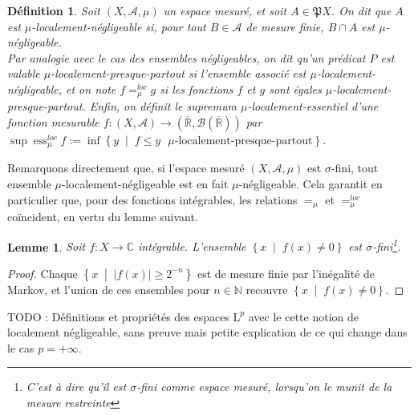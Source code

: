\documentclass[a4paper,12pt]{article}
\newtheorem{definition}[theorem]{Définition}
\newtheorem{lemma}[theorem]{Lemme}
\newcommand{\R}{\mathbb{R}}
\newcommand{\N}{\mathbb{N}}
\newcommand{\C}{\mathbb{C}}
\newcommand{\Bor}{\mathcal{B}}
\newcommand{\abs}[1]{\left\vert#1\right\vert}
\newcommand{\set}[1]{\left\{ #1 \right\}}
\newcommand{\tq}{\;\middle|\;}
\newcommand{\parts}{\mathfrak{P}}
\newcommand{\TODO}[1]{{\color{red}TODO :} #1}
\DeclareMathOperator{\ess}{ess}
\begin{document}
\begin{definition}\label{loc_negligible}
    Soit $(X, \mathcal{A}, \mu)$ un espace mesuré, et soit $A\in\parts{X}$. On dit que $A$ est \emph{$\mu$-localement-négligeable} 
    si, pour tout $B\in\mathcal{A}$ \emph{de mesure finie}, $B\cap A$ est $\mu$-négligeable. \\
    Par analogie avec le cas des ensembles négligeables, on dit qu'un prédicat $P$ est valable 
    \emph{$\mu$-localement-presque-partout} si l'ensemble associé est $\mu$-localement-négligeable,
    et on note $f =_\mu^{loc} g$ si les fonctions $f$ et $g$ sont égales $\mu$-localement-presque-partout.
    Enfin, on définit le \emph{supremum $\mu$-localement-essentiel} d'une fonction mesurable $f:(X, \mathcal{A})\to(\overline{\R},\Bor(\overline{\R}))$ par 
    $\sup\ess_\mu^{loc} f := \inf\set{y\tq f\le y\text{ $\mu$-localement-presque-partout}}$.
\end{definition}

Remarquons directement que, si l'espace mesuré $(X, \mathcal{A}, \mu)$ est $\sigma$-fini, 
tout ensemble $\mu$-localement-négligeable est en fait $\mu$-négligeable. Cela garantit en particulier que, 
pour des fonctions intégrables, les relations $=_\mu$ et $=_\mu^{loc}$ coïncident, en vertu du lemme suivant.

\begin{lemma}\label{presupp_sigma_finite}
    Soit $f:X\to\C$ intégrable. L'ensemble $\set{x\tq f(x)\ne 0}$ est $\sigma$-fini\footnote{C'est à dire qu'il est $\sigma$-fini comme espace mesuré, 
    lorsqu'on le munit de la mesure restreinte}. 
\end{lemma}

\begin{proof}
    Chaque $\set{x\tq \abs{f(x)}\ge 2^{-n}}$ est de mesure finie par l'inégalité de Markov, et l'union de ces ensembles pour 
    $n\in\N$ recouvre $\set{x\tq f(x)\ne 0}$.
\end{proof}

\TODO{Définitions et propriétés des espaces $\mathrm{L}^p$ avec le cette notion de localement négligeable, 
sans preuve mais petite explication de ce qui change dans le cas $p=+\infty$.}
\end{document}

